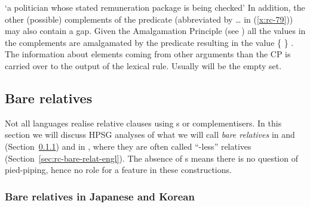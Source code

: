 \documentclass[output=paper,biblatex,babelshorthands,newtxmath,draftmode,colorlinks,citecolor=brown]{langscibook}
\begin{document}
\ea
{}
%
\glt `a politician whose stated remuneration package is being checked'
\z
%
In addition, the other (possible) complements of the predicate (abbreviated by \ldots{} in (\ref{x:rc-79})) may also
contain a gap. Given the \SLASH Amalgamation Principle (see \crossrefchapteralt[\pageref{udc:slash-amalgamation-principle}]{udc})  all the \SLASH values 
in the complements are amalgamated by the predicate resulting in the \SLASH value \{  \} \cupAVM
{}. The information about \SLASH elements coming from other arguments than the CP is carried
over to the output of the lexical rule. Usually  will be the empty set.
%
%
%



\subsection{Bare relatives}
\label{sec:rc-bare-relatives}

Not all languages realise relative clauses using s or complementisers. In this section we
will discuss HPSG analyses of what we will call \emph{bare relatives} in  and 
(Section~\ref{sec:rc-bare-relat-japan}) and in , where they are often called
``-less'' relatives (Section~\ref{sec:rc-bare-relat-engl}).  The absence of s means there is no question of pied-piping, hence no role for a 
feature in these constructions.

\subsubsection{Bare relatives in Japanese and Korean}
\label{sec:rc-bare-relat-japan}
\end{document}

